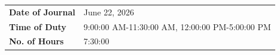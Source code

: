 \documentclass[a4paper]{article}
\begin{document}
	\begin{table}[t]
		\centering
		\begin{tabular*}{\textwidth}{@{\extracolsep{\fill}} ll }
			\textbf{Date of Journal}&June 22, 2026 \\
			\textbf{Time of Duty}&9:00:00 AM-11:30:00 AM, 12:00:00 PM-5:00:00 PM \\
			\textbf{No. of Hours}&7:30:00\\
		\end{tabular*}
	\end{table}
\end{document}
